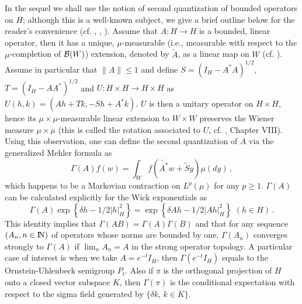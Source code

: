 \documentclass[12pt,a4paper]{book}
\newtheorem{lemma}[theorem]{Lemma}
\newcommand{\eps}{\varepsilon}
\newcommand{\NN}{{\rm I\!N}}
\newcommand{\calB}{{\cal B}}
\begin{document}
In the sequel we shall use the notion of second quantization of
bounded operators on $H$; although this is a well-known subject, we
give a brief outline below for the reader's convenience
(cf. \cite{BAD}, \cite{P-F}, \cite{Si}).
Assume that $A:H\to H$ is a bounded, linear operator, then it has a
unique, $\mu$-measurable (i.e., measurable with respect to the
$\mu$-completion of $\calB(W)$) extension, denoted by $\tilde{A}$,  as
a linear map on $W$ (cf. \cite{BAD,P-F}). Assume in particular
that $\|A\|\leq 1$ and define $S=(I_H-A^*A)^{1/2}$,
$T=(I_H-AA^*)^{1/2}$ and $U:H\times H\to H\times H$ as
$U(h,k)=(Ah+Tk,-Sh+A^*k)$. $U$ is then  a  unitary operator on $H\times H$,
hence its $\mu\times\mu$-measurable linear extension to $W\times W$
preserves the Wiener measure $\mu\times\mu$ (this is called the
rotation associated
to $U$, cf. \cite{UZ7}, Chapter VIII). Using this observation, one can define
the second quantization of $A$ via the generalized Mehler formula as
$$
\Gamma(A)f(w)=\int_Wf(\tilde{A^*}w+\tilde{S}y)\mu(dy)\,,
$$
which happens to be a Markovian contraction on $L^p(\mu)$ for any
$p\geq 1$. $\Gamma (A)$ can be calculated explicitly for the Wick
exponentials as
$$
\Gamma(A)\exp\left\{\delta h-1/2|h|_H^2\right\}=\exp\left\{\delta A
  h-1/2|Ah|_H^2\right\}\,\,(h\in H)\,.
$$
This identity implies that $\Gamma (AB)=\Gamma(A)\Gamma(B)$ and that
for any sequence $(A_n,n\in \NN)$ of operators whose norms are bounded
by one, $\Gamma(A_n)$ converges strongly to $\Gamma(A)$ if
$\lim_nA_n=A$ in the strong operator topology.
 A particular case of interest is  when we take $A=e^{-t}I_H$, then
 $\Gamma(e^{-t}I_H)$ equals to  the Ornstein-Uhlenbeck semigroup
 $P_t$. Also  if
 $\pi$ is the  orthogonal projection of $H$ onto a closed vector subspace
 $K$, then $\Gamma(\pi)$ is the conditional expectation with respect
 to the sigma field generated  by $\{\delta k,\,k\in K\}$.






\end{document}
